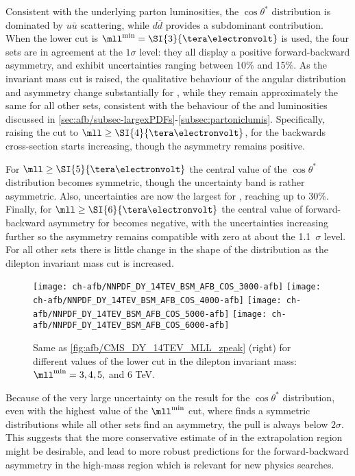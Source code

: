  Consistent with the underlying parton luminosities, the $\cos\theta^*$ distribution
 is dominated by $u\bar{u}$ scattering, while  $d\bar{d}$ provides
 a subdominant contribution.
 When the lower cut  is $\mll^{\text{min}}=\SI{3}{\tera\electronvolt}$ is used, the four \pdf
 sets are in agreement at the $1\sigma$ level: they all
 display a 
 positive forward-backward asymmetry, and exhibit \pdf uncertainties ranging between 10\% and 15\%.
 As the invariant mass cut is raised, the qualitative behaviour of the
 angular distribution and
 asymmetry change substantially for , while they remain
 approximately the same for all other \pdf sets, consistent with the
 behaviour of the \pdfs and luminosities discussed in
 \cref{sec:afb/subsec-largexPDFs}-\ref{subsec:partoniclumis}.
%
 Specifically,
 raising the cut to
 $\mll \ge \SI{4}{\tera\electronvolt}$, for 
 the backwards cross-section starts increasing, though the asymmetry remains
positive.

For $\mll\ge \SI{5}{\tera\electronvolt}$ the central value of the  $\cos\theta^*$
 distribution  becomes symmetric, though the  \pdf uncertainty band is
 rather asymmetric. Also, \pdf uncertainties
 are now the largest for , reaching up to 30\%.
 Finally, for $\mll\ge \SI{6}{\tera\electronvolt}$  the central value of 
 forward-backward asymmetry for  becomes negative, with the
 \pdf uncertainties increasing further so the asymmetry remains compatible
 with zero at about the 1.1~$\sigma$ level.
 For all other \pdf sets there is little change in the shape of the distribution as the
 dilepton invariant mass cut is increased.

\begin{figure}[t!]
 \centering
 \texttt{[image: ch-afb/NNPDF\_DY\_14TEV\_BSM\_AFB\_COS\_3000-afb]}
 \texttt{[image: ch-afb/NNPDF\_DY\_14TEV\_BSM\_AFB\_COS\_4000-afb]}
 \texttt{[image: ch-afb/NNPDF\_DY\_14TEV\_BSM\_AFB\_COS\_5000-afb]}
 \texttt{[image: ch-afb/NNPDF\_DY\_14TEV\_BSM\_AFB\_COS\_6000-afb]}
 \caption{Same as \cref{fig:afb/CMS_DY_14TEV_MLL_zpeak} (right)
   for different values of the  lower cut in the dilepton
   invariant mass: $\mll^{\text{min}}=3, 4,5,$ and 6 TeV.
  }    
 \label{fig:afb/CMS_DY_14TEV_MLL_others_asy}
\end{figure}

Because of the very large uncertainty on the  result for the $\cos\theta^*$
distribution, even with
the highest value of the  $\mll^{\text{min}}$ cut, where  finds a
symmetric distributions while all other \pdf sets find an asymmetry,
the pull is always below $2 \sigma$.
%
This suggests that the more
conservative estimate of   in the extrapolation region might be
desirable, and lead to more robust predictions for the
forward-backward asymmetry in the high-mass region which is relevant
for new physics searches.
